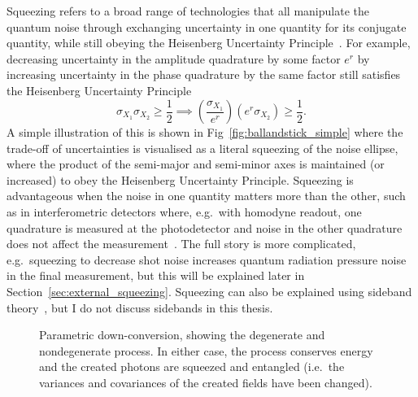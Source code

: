 Squeezing refers to a broad range of technologies that all manipulate the quantum noise through exchanging uncertainty in one quantity for its conjugate quantity, while still obeying the Heisenberg Uncertainty Principle~\cite{}. For example, decreasing uncertainty in the amplitude quadrature by some factor $e^r$ by increasing uncertainty in the phase quadrature by the same factor still satisfies the Heisenberg Uncertainty Principle
\begin{equation}
\sigma_{X_1}\sigma_{X_2}\geq\frac{1}{2}\implies (\frac{\sigma_{X_1}}{e^r}) (e^r\sigma_{X_2})\geq\frac{1}{2}\label{eq:HUP_squeezed}.
\end{equation} 
A simple illustration of this is shown in Fig~\ref{fig:ballandstick_simple} where the trade-off of uncertainties is visualised as a literal squeezing of the noise ellipse, where the product of the semi-major and semi-minor axes is maintained (or increased) to obey the Heisenberg Uncertainty Principle. Squeezing is advantageous when the noise in one quantity matters more than the other, such as in interferometric detectors where, e.g.\ with homodyne readout, one quadrature is measured at the photodetector and noise in the other quadrature does not affect the measurement~\cite{}. The full story is more complicated, e.g.\ squeezing to decrease shot noise increases quantum radiation pressure noise in the final measurement, but this will be explained later in Section~\ref{sec:external_squeezing}. Squeezing can also be explained using sideband theory~\cite{}, but I do not discuss sidebands in this thesis.


\begin{figure}
	\centering
	\caption{Parametric down-conversion, showing the degenerate and nondegenerate process. In either case, the process conserves energy and the created photons are squeezed and entangled (i.e.\ the variances and covariances of the created fields have been changed).}
	\label{fig:PDC_deg_and_nondeg}
\end{figure}


